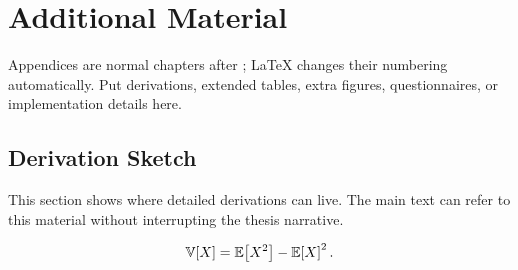 
\chapter{Additional Material}
\label{app:additional-material}

Appendices are normal chapters after \texttt{\string\appendix}; LaTeX changes
their numbering automatically. Put derivations, extended tables, extra figures,
questionnaires, or implementation details here.

\section{Derivation Sketch}

This section shows where detailed derivations can live. The main text can refer
to this material without interrupting the thesis narrative.

\begin{equation}
	\Var{X} = \E{X^2} - \E{X}^2.
\end{equation}
